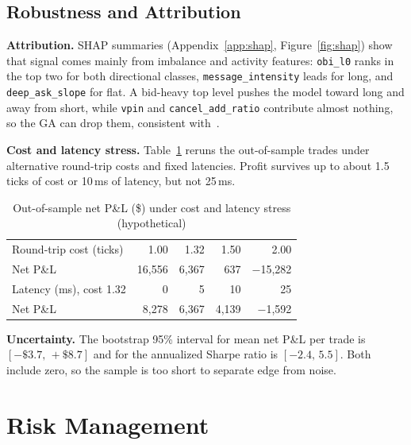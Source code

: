 \documentclass[11pt,letterpaper]{article}
\begin{document}
\subsection{Robustness and Attribution}
\textbf{Attribution.} SHAP summaries (Appendix~\ref{app:shap}, Figure~\ref{fig:shap}) show that signal comes mainly from imbalance and activity features: \texttt{obi\_\allowbreak l0} ranks in the top two for both directional classes, \texttt{message\_\allowbreak intensity} leads for long, and \texttt{deep\_\allowbreak ask\_\allowbreak slope} for flat. A bid-heavy top level pushes the model toward long and away from short, while \texttt{vpin} and \texttt{cancel\_\allowbreak add\_\allowbreak ratio} contribute almost nothing, so the GA can drop them, consistent with~\cite{christodoulou2025}.

\textbf{Cost and latency stress.} Table~\ref{tab:stress} reruns the out-of-sample trades under alternative round-trip costs and fixed latencies. Profit survives up to about 1.5 ticks of cost or 10\,ms of latency, but not 25\,ms.

\begin{table}[!htb]
\centering
\caption{Out-of-sample net P\&L (\$) under cost and latency stress (hypothetical)}
\label{tab:stress}
\small
\begin{tabular}{@{}lrrrr@{}}
\toprule
Round-trip cost (ticks) & 1.00 & 1.32 & 1.50 & 2.00 \\
Net P\&L & 16{,}556 & 6{,}367 & 637 & $-$15{,}282 \\
\midrule
Latency (ms), cost 1.32 & 0 & 5 & 10 & 25 \\
Net P\&L & 8{,}278 & 6{,}367 & 4{,}139 & $-$1{,}592 \\
\bottomrule
\end{tabular}
\end{table}

\textbf{Uncertainty.} The bootstrap 95\% interval for mean net P\&L per trade is $[-\$3.7,\,+\$8.7]$ and for the annualized Sharpe ratio is $[-2.4,\,5.5]$. Both include zero, so the sample is too short to separate edge from noise.
 
\section{Risk Management}
\end{document}

